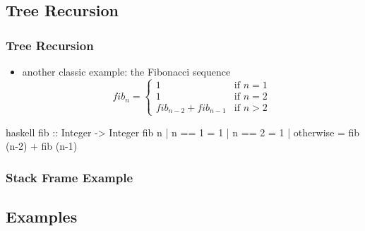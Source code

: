 \documentclass[dvipsnames]{beamer}
\theoremstyle{plain}
\begin{document}
\subsection{Tree Recursion}

\begin{frame}[fragile]
  \frametitle{Tree Recursion}

  \begin{itemize}
    \item another classic example: the Fibonacci sequence
    \[
      fib_n =
        \begin{cases}
          1                     & \mbox{if } n = 1\\
          1                     & \mbox{if } n = 2\\
          fib_{n-2} + fib_{n-1} & \mbox{if } n > 2
        \end{cases}
    \]
  \end{itemize}

  \begin{exampleblock}{}
    \begin{pygments}{haskell}
fib :: Integer -> Integer
fib n
  | n == 1    = 1
  | n == 2    = 1
  | otherwise = fib (n-2) + fib (n-1)
    \end{pygments}
  \end{exampleblock}
\end{frame}

\begin{frame}[fragile]
  \frametitle{Stack Frame Example}

  \begin{center}
  \end{center}
\end{frame}

\subsection{Examples}
\end{document}
